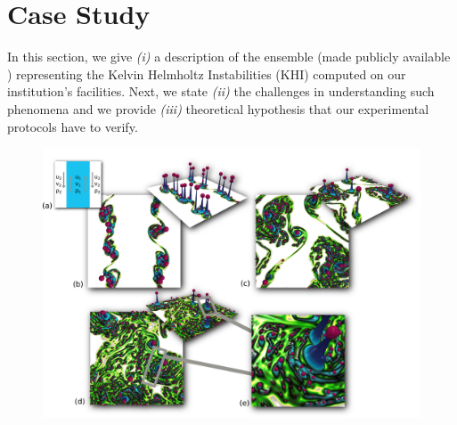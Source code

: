 \section{Case Study}

\label{sec_caseStudy}
In this section, we give \emph{(i)} a description of the ensemble (made publicly
available \cite{data})
representing the Kelvin Helmholtz Instabilities (KHI) computed on 
our institution's
facilities.
Next, we state \emph{(ii)} the challenges in understanding
such phenomena and we
provide
\emph{(iii)} theoretical hypothesis that our
experimental protocols have to verify.   

\begin{figure}
 \centering
 \vspace{-1ex}
 \includegraphics[width=\figureShrink\linewidth]{chapter4_topology_data_analysis/pictures/init_case.jpg}
 \vspace{-2ex}
  \vspace{2ex}
 \label{initcase}
\end{figure}


